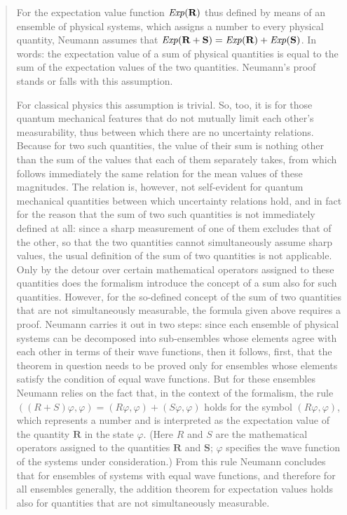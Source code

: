 \documentclass[12pt]{article}
\begin{document}
\begin{quote}
For the expectation value function ${\it Exp}(\textbf{R})$ thus defined by means of an ensemble of physical systems, which assigns a number to every physical quantity, Neumann assumes that ${\it Exp}(\textbf{R}+\textbf{S}) = {\it Exp}(\textbf{R})+{\it Exp}(\textbf{S})$. In words: the expectation value of a sum of physical quantities is equal to the sum of the expectation values of the two quantities. Neumann's proof stands or falls with this assumption.

For classical physics this assumption is trivial. So, too, it is for those quantum
mechanical features that do not mutually limit each other's measurability, thus between
which there are no uncertainty relations. Because for two such quantities, the
value of their sum is nothing other than the sum of the values that each of them
separately takes, from which follows immediately the same relation for the mean
values of these magnitudes. The relation is, however, not self-evident for quantum
mechanical quantities between which uncertainty relations hold, and in fact for the
reason that the sum of two such quantities is not immediately defined at all: since a
sharp measurement of one of them excludes that of the other, so that the two quantities
cannot simultaneously assume sharp values, the usual definition of the sum
of two quantities is not applicable. Only by the detour over certain mathematical
operators assigned to these quantities does the formalism introduce the concept of
a sum also for such quantities.
However, for the so-defined concept of the sum of two quantities that are not
simultaneously measurable, the formula given above requires a proof. Neumann carries
it out in two steps: since each ensemble of physical systems can be decomposed
into sub-ensembles whose elements agree with each other in terms of their wave
functions, then it follows, first, that the theorem in question needs to be proved only
for ensembles whose elements satisfy the condition of equal wave functions. But for
these ensembles Neumann relies on the fact that, in the context of the formalism, the
rule $((R+S)\varphi, \varphi) = (R\varphi, \varphi)+(S\varphi, \varphi)$ holds for the symbol $(R\varphi, \varphi)$, which represents
a number and is interpreted as the expectation value of the quantity $\textbf{R}$ in the state
$\varphi$. (Here $R$ and $S$ are the mathematical operators assigned to the quantities $\textbf{R}$ and
$\textbf{S}$; $\varphi$ specifies the wave function of the systems under consideration.) From this rule
Neumann concludes that for ensembles of systems with equal wave functions, and
therefore for all ensembles generally, the addition theorem for expectation values
holds also for quantities that are not simultaneously measurable.

\end{quote}
\end{document}
